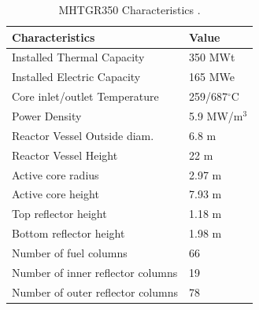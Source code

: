 \begin{table}[htbp!]
  \centering
    \caption{MHTGR350 Characteristics \cite{oecd_nea_benchmark_2017}.}
  \begin{tabular}{ll}
  \toprule
  Characteristics                   & Value               \\ \midrule
  Installed Thermal Capacity        & 350 MWt             \\
  Installed Electric Capacity       & 165 MWe             \\
  Core inlet/outlet Temperature     & 259/687$^{\circ}$C  \\
  Power Density                     & 5.9 MW/m$^3$        \\
  Reactor Vessel Outside diam.      & 6.8 m               \\
  Reactor Vessel Height             & 22 m                \\
  Active core radius                & 2.97 m              \\
  Active core height                & 7.93 m              \\
  Top reflector height              & 1.18 m              \\
  Bottom reflector height           & 1.98 m              \\
  Number of fuel columns            & 66                  \\
  Number of inner reflector columns & 19                  \\
  Number of outer reflector columns & 78                  \\
  \bottomrule
  \end{tabular}
  \label{tab:maincharac}
\end{table}

